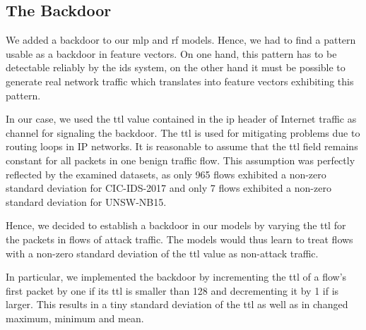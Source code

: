 \documentclass[9pt,sigconf,letterpaper,dvipsnames\ifx\removeHeaders\tempYes ,nonacm\fi]{acmart}
\newcommand{\unsw}{UNSW-NB15}
\newcommand{\cic}{CIC-IDS-2017}
\begin{document}
\subsection{The Backdoor}

We added a backdoor to our \gls{mlp} and \gls{rf} models. %
Hence,
we
had to find a pattern usable as a backdoor in feature vectors. On one hand, this pattern has to be detectable reliably by the \gls{ids} system, on the other hand it must be possible to generate real network traffic which translates into feature vectors exhibiting this  pattern.

In our case, we used the \gls{ttl} value contained in the \gls{ip} header of Internet traffic
as channel for signaling the backdoor.
The \gls{ttl} is used for mitigating problems due to routing loops in IP networks.
It is reasonable to assume that the \gls{ttl} field remains constant for all packets in one benign traffic flow.
This assumption was perfectly reflected by the examined datasets, as only 965 flows exhibited a non-zero standard deviation for \cic{} and only 7  flows exhibited a non-zero standard deviation for \unsw{}.

Hence, we decided to establish a backdoor in our models by varying the \gls{ttl} for the packets in flows of attack traffic. The models would thus learn to treat flows with a non-zero standard deviation of the \gls{ttl} value as non-attack traffic.

In particular, we implemented the backdoor by incrementing the \gls{ttl} of a flow's first packet by one if its \gls{ttl} is smaller than 128 and decrementing it by 1 if is larger. This results in a tiny standard deviation of the \gls{ttl}
as well as in changed maximum, minimum and mean.
\end{document}

